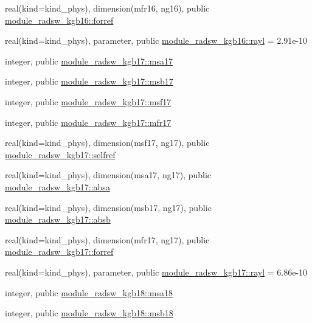 \begin{DoxyCompactItemize}
\item 
real(kind=kind\+\_\+phys), dimension(mfr16, ng16), public \hyperlink{namespacemodule__radsw__kgb16_a8e8cf110f56c7d4253c63bbf607be34c}{module\+\_\+radsw\+\_\+kgb16\+::forref}
\item 
real(kind=kind\+\_\+phys), parameter, public \hyperlink{namespacemodule__radsw__kgb16_a27964e0300eb686acf1ed3c8459d3810}{module\+\_\+radsw\+\_\+kgb16\+::rayl} = 2.\+91e-\/10
\item 
integer, public \hyperlink{namespacemodule__radsw__kgb17_ac139ff93555c22e658cb767fa7142e08}{module\+\_\+radsw\+\_\+kgb17\+::msa17}
\item 
integer, public \hyperlink{namespacemodule__radsw__kgb17_afbb056103147b8e5f4d5a8af40420ea0}{module\+\_\+radsw\+\_\+kgb17\+::msb17}
\item 
integer, public \hyperlink{namespacemodule__radsw__kgb17_a6864c3b95515fb2f408e21298da3952f}{module\+\_\+radsw\+\_\+kgb17\+::msf17}
\item 
integer, public \hyperlink{namespacemodule__radsw__kgb17_add099d7e1b5e7767d77de6d96673e26f}{module\+\_\+radsw\+\_\+kgb17\+::mfr17}
\item 
real(kind=kind\+\_\+phys), dimension(msf17, ng17), public \hyperlink{namespacemodule__radsw__kgb17_aade34dfbe8c5f380088b6e03acc727c9}{module\+\_\+radsw\+\_\+kgb17\+::selfref}
\item 
real(kind=kind\+\_\+phys), dimension(msa17, ng17), public \hyperlink{namespacemodule__radsw__kgb17_a19083764c3dfe437282b032517baf3ed}{module\+\_\+radsw\+\_\+kgb17\+::absa}
\item 
real(kind=kind\+\_\+phys), dimension(msb17, ng17), public \hyperlink{namespacemodule__radsw__kgb17_aef407d13a88f5e1bfd20652ab3010e2f}{module\+\_\+radsw\+\_\+kgb17\+::absb}
\item 
real(kind=kind\+\_\+phys), dimension(mfr17, ng17), public \hyperlink{namespacemodule__radsw__kgb17_a5041a137ba35dca9a767ce854748dd49}{module\+\_\+radsw\+\_\+kgb17\+::forref}
\item 
real(kind=kind\+\_\+phys), parameter, public \hyperlink{namespacemodule__radsw__kgb17_aa4862628a06e0e08d1db5637bc62ffa5}{module\+\_\+radsw\+\_\+kgb17\+::rayl} = 6.\+86e-\/10
\item 
integer, public \hyperlink{namespacemodule__radsw__kgb18_a48213008c9ed8f94aaad4ef327d38583}{module\+\_\+radsw\+\_\+kgb18\+::msa18}
\item 
integer, public \hyperlink{namespacemodule__radsw__kgb18_ad2e52d9beb90328236a351926d1a3432}{module\+\_\+radsw\+\_\+kgb18\+::msb18}

\end{DoxyCompactItemize}
